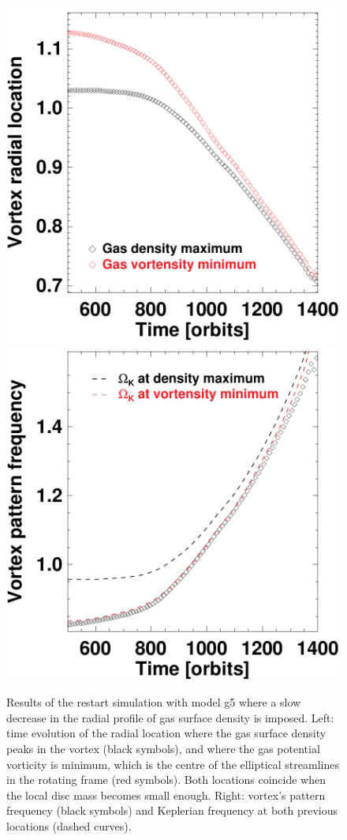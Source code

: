 \documentclass[a4paper,usenatbib]{mnras}
\begin{document}
\begin{figure}
\centering
\resizebox{0.49\hsize}{!}
  {
 \includegraphics{f7a.pdf}
  }
  \resizebox{0.49\hsize}{!}
  {
 \includegraphics{f7b.pdf}
  }
  \caption{\label{fig:vps}Results of the restart simulation with model
    g5 where a slow decrease in the radial profile of gas surface
    density is imposed. Left: time evolution of the radial location
    where the gas surface density peaks in the vortex (black symbols),
    and where the gas potential vorticity is minimum, which is the
    centre of the elliptical streamlines in the rotating frame (red
    symbols). Both locations coincide when the local disc mass becomes
    small enough. Right: vortex's pattern frequency (black symbols)
    and Keplerian frequency at both previous locations (dashed
    curves).}
\end{figure}
\end{document}
